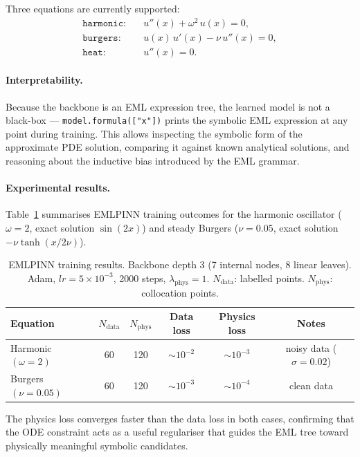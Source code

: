 \documentclass[11pt,a4paper]{article}
\begin{document}
Three equations are currently supported:
\begin{align}
  \texttt{harmonic:}\quad & u''(x) + \omega^2\,u(x) = 0, \label{eq:harmonic}\\
  \texttt{burgers:}\quad  & u(x)\,u'(x) - \nu\,u''(x) = 0, \label{eq:burgers}\\
  \texttt{heat:}\quad     & u''(x) = 0. \label{eq:heat}
\end{align}

\paragraph{Interpretability.}
Because the backbone is an EML expression tree, the learned model is not a
black-box — \texttt{model.formula(["x"])} prints the symbolic EML expression at
any point during training.  This allows inspecting the symbolic form of the
approximate PDE solution, comparing it against known analytical solutions, and
reasoning about the inductive bias introduced by the EML grammar.

\paragraph{Experimental results.}
Table~\ref{tab:pinn} summarises EMLPINN training outcomes for the harmonic
oscillator ($\omega=2$, exact solution $\sin(2x)$) and steady Burgers
($\nu=0.05$, exact solution $-\nu\tanh(x/2\nu)$).

\begin{table}[h]
\centering
\small
\caption{EMLPINN training results. Backbone depth 3 (7 internal nodes, 8 linear
  leaves). Adam, $lr=5\times10^{-3}$, 2000 steps, $\lambda_{\text{phys}}=1$.
  $N_{\text{data}}$: labelled points. $N_{\text{phys}}$: collocation points.}
\label{tab:pinn}
\begin{tabular}{lccccc}
\toprule
Equation & $N_{\text{data}}$ & $N_{\text{phys}}$ & Data loss & Physics loss & Notes \\
\midrule
Harmonic $(\omega=2)$ & 60 & 120 & $\sim10^{-2}$ & $\sim10^{-3}$ & noisy data ($\sigma=0.02$) \\
Burgers  $(\nu=0.05)$ & 60 & 120 & $\sim10^{-3}$ & $\sim10^{-4}$ & clean data \\
\bottomrule
\end{tabular}
\end{table}

The physics loss converges faster than the data loss in both cases,
confirming that the ODE constraint acts as a useful regulariser that guides
the EML tree toward physically meaningful symbolic candidates.
\end{document}
